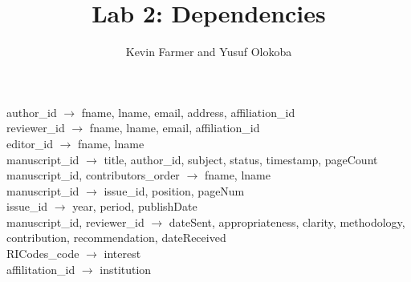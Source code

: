 \documentclass{article}
\title{Lab 2: Dependencies}
\author{Kevin Farmer and Yusuf Olokoba}
\newcommand{\ra}{$\rightarrow$ }
\begin{document}
\maketitle


author\_id \ra fname, lname, email, address, affiliation\_id \\
reviewer\_id \ra fname, lname, email, affiliation\_id \\
editor\_id \ra fname, lname \\

manuscript\_id \ra title, author\_id, subject, status, timestamp, pageCount \\

manuscript\_id, contributors\_order \ra fname, lname \\

manuscript\_id \ra issue\_id, position, pageNum \\

issue\_id \ra year, period, publishDate \\

manuscript\_id, reviewer\_id \ra dateSent, appropriateness, clarity, methodology, contribution, recommendation, dateReceived \\

RICodes\_code \ra interest \\

affilitation\_id \ra institution \\
\end{document}

